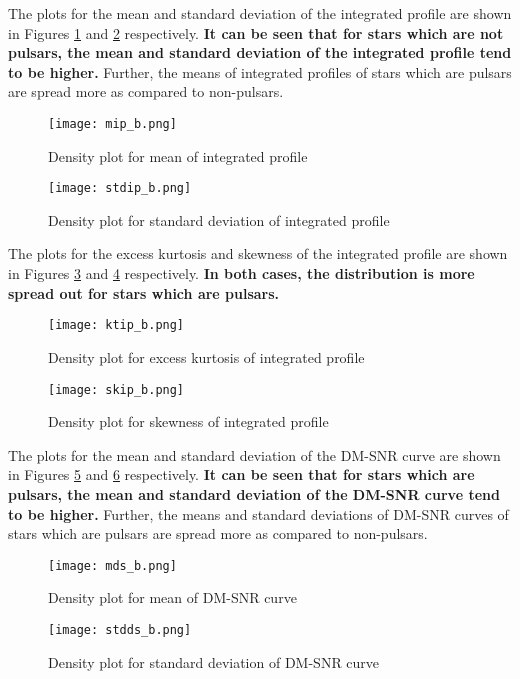 \documentclass[conference]{IEEEtran}
\begin{document}
The plots for the mean and standard deviation of the integrated profile are shown in Figures \ref{mip_b} and \ref{stdip_b} respectively. \textbf{It can be seen that for stars which are not pulsars, the mean and standard deviation of the integrated profile tend to be higher.} Further, the means of integrated profiles of stars which are pulsars are spread more as compared to non-pulsars. 

\begin{figure}[tbh]
\centering
\texttt{[image: mip\_b.png]}
\caption{Density plot for mean of integrated profile}
\label{mip_b}
\end{figure}

\begin{figure}[tbh]
\centering
\texttt{[image: stdip\_b.png]}
\caption{Density plot for standard deviation of integrated profile}
\label{stdip_b}
\end{figure}

The plots for the excess kurtosis and skewness of the integrated profile are shown in Figures \ref{kip_b} and \ref{skip_b} respectively. \textbf{In both cases, the distribution is more spread out for stars which are pulsars.}

\begin{figure}[tbh]
\centering
\texttt{[image: ktip\_b.png]}
\caption{Density plot for excess kurtosis of integrated profile}
\label{kip_b}
\end{figure}

\begin{figure}[tbh]
\centering
\texttt{[image: skip\_b.png]}
\caption{Density plot for skewness of integrated profile}
\label{skip_b}
\end{figure}


The plots for the mean and standard deviation of the DM-SNR curve are shown in Figures \ref{mds_b} and \ref{stdds_b} respectively. \textbf{It can be seen that for stars which are  pulsars, the mean and standard deviation of the DM-SNR curve tend to be higher.} Further, the means and standard deviations of DM-SNR curves of stars which are pulsars are spread more as compared to non-pulsars. 

\begin{figure}[tbh]
\centering
\texttt{[image: mds\_b.png]}
\caption{Density plot for mean of DM-SNR curve}
\label{mds_b}
\end{figure}

\begin{figure}[tbh]
\centering
\texttt{[image: stdds\_b.png]}
\caption{Density plot for standard deviation of DM-SNR curve}
\label{stdds_b}
\end{figure}
\end{document}
